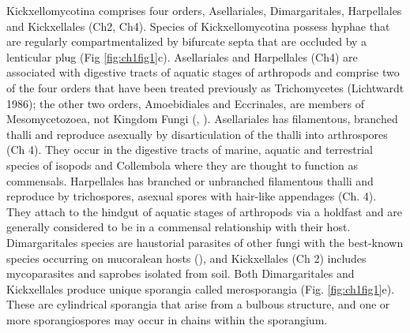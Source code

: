 \documentclass[]{book}
\begin{document}
Kickxellomycotina comprises four orders, Asellariales, Dimargaritales, Harpellales and Kickxellales (Ch2, Ch4). Species of Kickxellomycotina possess hyphae that are regularly compartmentalized by bifurcate septa that are occluded by a lenticular plug (Fig \ref{fig:ch1fig1}c). Asellariales and Harpellales (Ch4) are associated with digestive tracts of aquatic stages of arthropods and comprise two of the four orders that have been treated previously as Trichomycetes (Lichtwardt 1986); the other two orders, Amoebidiales and Eccrinales, are members of Mesomycetozoea, not Kingdom Fungi (\citet{Benny_2000}, \citet{Cafaro_2005}). Asellariales has filamentous, branched thalli and reproduce asexually by disarticulation of the thalli into arthrospores (Ch 4). They occur in the digestive tracts of marine, aquatic and terrestrial species of isopods and Collembola where they are thought to function as commensals. Harpellales has branched or unbranched filamentous thalli and reproduce by trichospores, asexual spores with hair-like appendages (Ch. 4). They attach to the hindgut of aquatic stages of arthropods via a holdfast and are generally considered to be in a commensal relationship with their host. Dimargaritales species are haustorial parasites of other fungi with the best-known species occurring on mucoralean hosts (\citet{Benjamin_1965}), and Kickxellales (Ch 2) includes mycoparasites and saprobes isolated from soil. Both Dimargaritales and Kickxellales produce unique sporangia called merosporangia (Fig. \ref{fig:ch1fig1}e). These are cylindrical sporangia that arise from a bulbous structure, and one or more sporangiospores may occur in chains within the sporangium.
\end{document}
